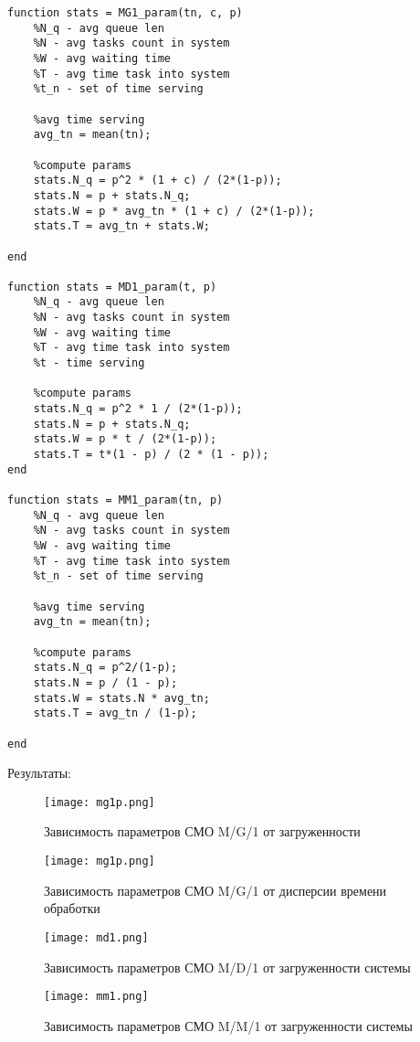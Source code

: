 \begin{lstlisting}
function stats = MG1_param(tn, c, p)
    %N_q - avg queue len
    %N - avg tasks count in system
    %W - avg waiting time 
    %T - avg time task into system
    %t_n - set of time serving

    %avg time serving
    avg_tn = mean(tn);

    %compute params
    stats.N_q = p^2 * (1 + c) / (2*(1-p));
    stats.N = p + stats.N_q;
    stats.W = p * avg_tn * (1 + c) / (2*(1-p));
    stats.T = avg_tn + stats.W;

end

function stats = MD1_param(t, p)
    %N_q - avg queue len
    %N - avg tasks count in system
    %W - avg waiting time 
    %T - avg time task into system
    %t - time serving

    %compute params
    stats.N_q = p^2 * 1 / (2*(1-p));
    stats.N = p + stats.N_q;
    stats.W = p * t / (2*(1-p));
    stats.T = t*(1 - p) / (2 * (1 - p));
end

function stats = MM1_param(tn, p)
    %N_q - avg queue len
    %N - avg tasks count in system
    %W - avg waiting time 
    %T - avg time task into system
    %t_n - set of time serving

    %avg time serving
    avg_tn = mean(tn);

    %compute params
    stats.N_q = p^2/(1-p);
    stats.N = p / (1 - p);
    stats.W = stats.N * avg_tn;
    stats.T = avg_tn / (1-p);

end
\end{lstlisting}

Результаты:

\begin{figure}[H]
    \centering
    \texttt{[image: mg1p.png]}
    \caption{Зависимость параметров СМО M/G/1 от загруженности}
\end{figure}

\begin{figure}[H]
    \centering
    \texttt{[image: mg1p.png]}
    \caption{Зависимость параметров СМО M/G/1 от дисперсии времени обработки}
\end{figure}

\begin{figure}[H]
    \centering
    \texttt{[image: md1.png]}
    \caption{Зависимость параметров СМО M/D/1 от загруженности системы}
\end{figure}

\begin{figure}[H]
    \centering
    \texttt{[image: mm1.png]}
    \caption{Зависимость параметров СМО M/M/1 от загруженности системы}
\end{figure}


